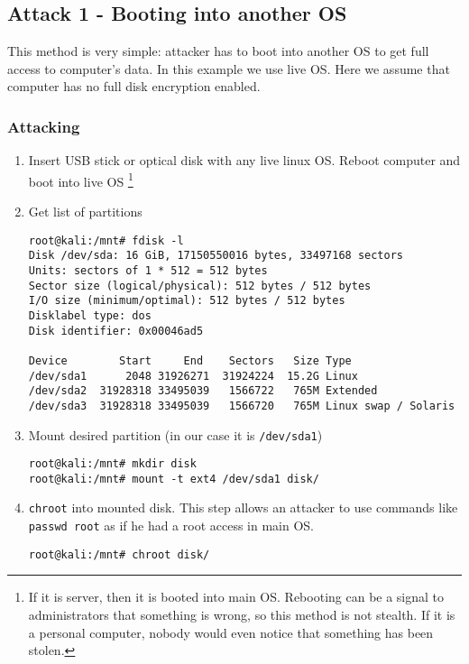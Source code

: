 \subsection{Attack 1 - Booting into another OS}\label{a1}
This method is very simple: attacker has to boot into another OS to get full access to computer's data. In this example we use live OS. Here we assume that computer has no full disk encryption enabled.


\subsubsection*{Attacking}
\begin{enumerate}
    \item Insert USB stick or optical disk with any live linux OS. Reboot computer and boot into live OS \footnote{If it is server, then it is booted into main OS. Rebooting can be a signal to administrators that something is wrong, so this method is not stealth. If it is a personal computer, nobody would even notice that something has been stolen.}
    
    \item Get list of partitions \label{root-start}
\begin{lstlisting}
root@kali:/mnt# fdisk -l
Disk /dev/sda: 16 GiB, 17150550016 bytes, 33497168 sectors
Units: sectors of 1 * 512 = 512 bytes
Sector size (logical/physical): 512 bytes / 512 bytes
I/O size (minimum/optimal): 512 bytes / 512 bytes
Disklabel type: dos
Disk identifier: 0x00046ad5

Device        Start     End    Sectors   Size Type
/dev/sda1      2048 31926271  31924224  15.2G Linux
/dev/sda2  31928318 33495039   1566722   765M Extended
/dev/sda3  31928318 33495039   1566720   765M Linux swap / Solaris
\end{lstlisting}

    \item Mount desired partition (in our case it is \texttt{/dev/sda1})
\begin{lstlisting}
root@kali:/mnt# mkdir disk
root@kali:/mnt# mount -t ext4 /dev/sda1 disk/
\end{lstlisting}

    \item \texttt{chroot} into mounted disk. This step allows an attacker to use commands like \texttt{passwd root} as if he had a root access in main OS. \label{root-end}
    
\begin{lstlisting}
root@kali:/mnt# chroot disk/
\end{lstlisting}
\end{enumerate}

